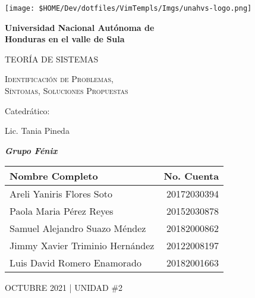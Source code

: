 \documentclass[12pt]{article}
\begin{document}
\begin{titlepage}

  \begin{center}
    {\texttt{[image: \$HOME/Dev/dotfiles/VimTempls/Imgs/unahvs-logo.png]}\par}
  
    {\bfseries\Huge Universidad Nacional Autónoma de\\
                     Honduras en el valle de Sula \par}
  
    \vspace{1cm}
  
    {\scshape\huge TEORÍA DE SISTEMAS\par}
  
    \vspace{1cm}
  
    {\scshape\Large Identificación de Problemas,\\
              Síntomas, Soluciones Propuestas }
  
    \vfill 
    {\large Catedrático:\par} %
    {\large Lic. Tania Pineda\par} %
  
    \vfill

      \textbf{\textit{ Grupo Fénix }}
    
      \begin{tabular}{lr} \toprule
          Nombre Completo & No. Cuenta\\ \midrule
          Areli Yaniris Flores Soto & 20172030394 \\
          Paola Maria Pérez Reyes & 20152030878 \\
          Samuel Alejandro Suazo Méndez & 20182000862 \\
          Jimmy Xavier Triminio Hernández & 20122008197 \\
          Luis David Romero Enamorado & 20182001663 \\ \bottomrule
      \end{tabular} 

    \vfill
    {\large OCTUBRE 2021 | UNIDAD \#2 \par} %

  \end{center}

\end{titlepage}
\end{document}
